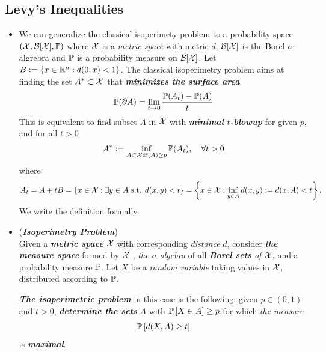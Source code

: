 \documentclass[11pt]{article}
\begin{document}
\subsection{Levy's Inequalities}
\begin{itemize}
\item \begin{remark}
We can generalize the classical isoperimety problem to a probability space $({\mathcal X}, {\mathcal B}[{\mathcal X}], {\mathbb P})$ where ${\mathcal X}$ is a \emph{metric space} with metric $d$, ${\mathcal B}[{\mathcal X}]$ is the Borel $\sigma$-algrebra and ${\mathbb P}$ is a probability measure on ${\mathcal B}[{\mathcal X}]$. Let  $B := \left\{x \in {\mathbb R}^n: d(0, x) < 1\right\}$. The classical isoperimetry problem aims at finding the set $A^{*} \subset {\mathcal X}$ that \emph{\textbf{minimizes the surface area}}
\begin{align*}
{\mathbb P}(\partial A) = \lim\limits_{t \to 0}\frac{{\mathbb P}(A_t) - {\mathbb P}(A)}{t}
\end{align*} This is equivalent to find subset $A$ in ${\mathcal X}$ with \emph{\textbf{minimal $t$-blowup}} for given $p$, and for all $t >0$
\begin{align*}
A^{*} := \inf_{A \subset {\mathcal X}: {\mathbb P}(A) \ge p}{\mathbb P}(A_t), \quad \forall t > 0
\end{align*} where 
\begin{align*}
A_t = A + tB = \left\{x \in {\mathcal X}:  \exists y \in A \text{ s.t. } d(x, y) < t\right\} = \left\{x \in {\mathcal X}:  \inf_{y \in A}d(x, y) := d(x, A) < t\right\}.
\end{align*} We write the definition formally.
\end{remark}


\item \begin{definition} (\emph{\textbf{Isoperimetry Problem}}) \citep{boucheron2013concentration}\\
Given a \emph{\textbf{metric space}} ${\mathcal X}$ with corresponding \emph{distance} $d$, consider \emph{\textbf{the measure space}} formed by ${\mathcal X}$ , \emph{the $\sigma$-algebra} of all \emph{\textbf{Borel sets} of ${\mathcal X}$}, and a probability measure ${\mathbb P}$. Let $X$ be a \emph{random variable} taking values in ${\mathcal X}$, distributed according to ${\mathbb P}$. 

\underline{\emph{\textbf{The isoperimetric problem}}} in this case is the following: given $p \in (0, 1)$ and $t > 0$, \emph{\textbf{determine the sets}} $A$ with ${\mathbb P}\left[X \in A\right] \ge p$ for which \emph{the measure}
\begin{align*}
{\mathbb P}\left[d(X, A) \ge t\right]
\end{align*}  is \emph{\textbf{maximal}}. 
\end{definition}


\end{itemize}
\end{document}

